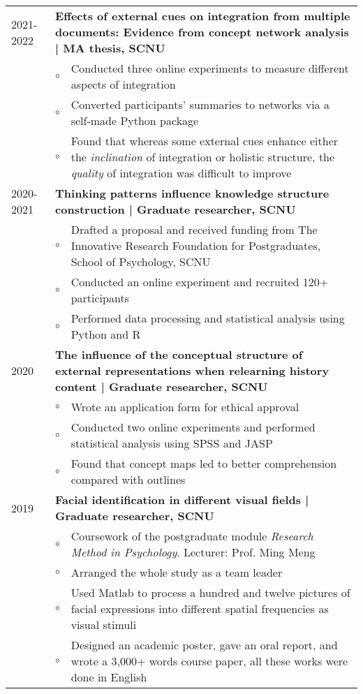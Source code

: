 \documentclass[a4paper, 12pt]{article}
\begin{document}
\begin{tabularx}{\textwidth}{p{2cm} p{0.1cm} X}

    2021-2022 & \multicolumn{2}{X}{\textbf{Effects of external cues on integration from multiple documents: Evidence from concept network analysis | MA thesis, SCNU}} \\
    & $\circ$ & Conducted three online experiments to measure different aspects of integration \\
    & $\circ$ & Converted participants' summaries to networks via a self-made Python package\\
    & $\circ$ & Found that whereas some external cues enhance either the \textit{inclination} of integration or holistic structure, the \textit{quality} of integration was difficult to improve  \\

    2020-2021 & \multicolumn{2}{X}{\textbf{Thinking patterns influence knowledge structure construction | Graduate researcher, SCNU}} \\
    & $\circ$ & Drafted a proposal and received funding from The Innovative Research Foundation for Postgraduates, School of Psychology, SCNU \\
    & $\circ$ & Conducted an online experiment and recruited 120+ participants  \\
    & $\circ$ & Performed data processing and statistical analysis using Python and R \\
    
    2020 & \multicolumn{2}{X}{\textbf{The influence of the conceptual structure of external representations when relearning history content | Graduate researcher, SCNU}} \\
    & $\circ$ & Wrote an application form for ethical approval \\
    & $\circ$ & Conducted two online experiments and performed statistical analysis using SPSS and JASP \\
    & $\circ$ & Found that concept maps led to better comprehension compared with outlines \\

    2019 & \multicolumn{2}{X}{\textbf{Facial identification in different visual fields | Graduate researcher, SCNU}} \\
    & $\circ$ & Coursework of the postgraduate module \textit{Research Method in Psychology}. Lecturer: Prof. Ming Meng \\ 
    & $\circ$ & Arranged the whole study as a team leader \\
    & $\circ$ & Used Matlab to process a hundred and twelve pictures of facial expressions into different spatial frequencies as visual stimuli \\
    & $\circ$ & Designed an academic poster, gave an oral report, and wrote a 3,000+ words course paper, all these works were done in English \\
    


\end{tabularx}
\end{document}
